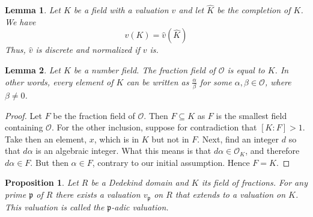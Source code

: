 \documentclass{article}
\newtheorem{proposition}{Proposition}[section]
\newtheorem{lemma}{Lemma}[section]
\newcommand{\mfrak}[1]{\mathfrak{#1}}
\newcommand{\mcal}[1]{\mathcal{#1}}
\begin{document}
\begin{lemma} \label{lem: Image of valuation and completed valuation are the same}
    Let $K$ be a field with a valuation $v$ and let $\hat K$ be the completion of $K$. We have 
    $$v(K) = \hat v(\hat K)$$
    Thus, $\hat v$ is discrete and normalized if $v$ is.
\end{lemma}


\begin{lemma} \label{lem: Fraction field of ring of integers is number field}
    Let $K$ be a number field. The fraction field of $\mcal O$ is equal to $K$. In other words, every element of $K$ can be written as $\frac{\alpha}{\beta}$ for some $\alpha, \beta \in \mcal O$, where $\beta \neq 0$.
\end{lemma}
\begin{proof}
    Let $F$ be the fraction field of $\mcal O$. Then $F \subseteq K$ as $F$ is the smallest field containing $\mcal O$. For the other inclusion, suppose for contradiction that $[K : F] > 1$. Take then an element, $x$, which is in $K$ but not in $F$. Next, find an integer $d$ so that $d \alpha$ is an algebraic integer. What this means is that $d \alpha \in \mcal O_K$, and therefore $d \alpha \in F$. But then $\alpha \in F$, contrary to our initial assumption. Hence $F = K$.
\end{proof}


\begin{proposition}
    Let $R$ be a Dedekind domain and $K$ its field of fractions. For any prime $\mfrak p$ of $R$ there exists a valuation $v_\mfrak{p}$ on $R$ that extends to a valuation on $K$. This valuation is called the $\mfrak p$-adic valuation.
\end{proposition}
\end{document}
